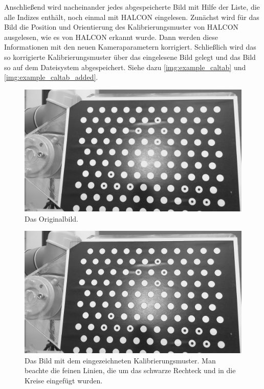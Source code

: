 Anschließend wird nacheinander jedes abgespeicherte Bild mit Hilfe der Liste, die alle Indizes enthält, noch einmal mit HALCON eingelesen. Zunächst wird für das Bild die Position und Orientierung des Kalibrierungsmuster von HALCON ausgelesen, wie es von HALCON erkannt wurde. Dann werden diese Informationen mit den neuen Kameraparametern korrigiert. Schließlich wird das so korrigierte Kalibrierungsmuster über das eingelesene Bild gelegt und das Bild so auf dem Dateisystem abgespeichert. Siehe dazu \autoref{img:example_caltab} und \autoref{img:example_caltab_added}.
\begin{figure}
\centering
\includegraphics[width=\textwidth]{images/example_caltab}
\caption{Das Originalbild.}\label{img:example_caltab}
\end{figure}
\begin{figure}
\centering
\includegraphics[width=\textwidth]{images/example_caltab_added}
\caption{Das Bild mit dem eingezeichneten Kalibrierungsmuster. Man beachte die feinen Linien, die um das schwarze Rechteck und in die Kreise eingefügt wurden.}\label{img:example_caltab_added}
\end{figure}

